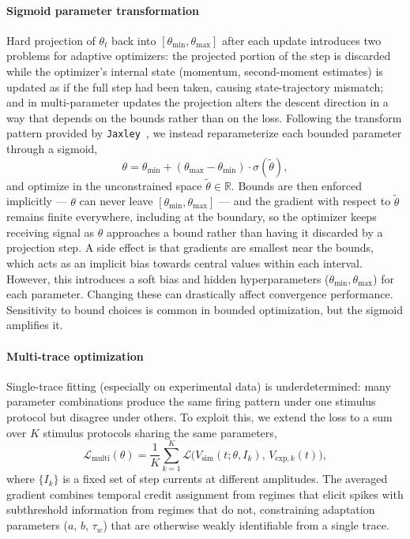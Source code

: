 \paragraph{Sigmoid parameter transformation}\label{sec:method:opt:stabilization:sigmoid}
Hard projection of $\theta_t$ back into $[\theta_{\min}, \theta_{\max}]$ after each update introduces two problems for adaptive optimizers:
the projected portion of the step is discarded while the optimizer's internal state (momentum, second-moment estimates) is updated as if the full step had been taken, causing state-trajectory mismatch;
and in multi-parameter updates the projection alters the descent direction in a way that depends on the bounds rather than on the loss.
Following the transform pattern provided by \texttt{Jaxley}~\cite{Deistler2025},
we instead reparameterize each bounded parameter through a sigmoid,
\begin{equation}
    \theta = \theta_{\min} + (\theta_{\max} - \theta_{\min}) \cdot \sigma(\tilde{\theta}),
\end{equation}
and optimize in the unconstrained space $\tilde{\theta}\in\mathbb{R}$.
Bounds are then enforced implicitly --- $\theta$ can never leave $[\theta_{\min},\theta_{\max}]$ ---
and the gradient with respect to $\tilde{\theta}$ remains finite everywhere, including at the boundary,
so the optimizer keeps receiving signal as $\theta$ approaches a bound rather than having it discarded by a projection step.
A side effect is that gradients are smallest near the bounds, which acts as an implicit bias towards central values within each interval.
However, this introduces a soft bias and hidden hyperparameters ($\theta_{\min}, \theta_{\max}$) for each parameter.
Changing these can drastically affect convergence performance.
Sensitivity to bound choices is common in bounded optimization, but the sigmoid amplifies it.

\paragraph{Multi-trace optimization}\label{sec:method:opt:stabilization:multi-trace}
Single-trace fitting (especially on experimental data) is underdetermined: many parameter combinations produce the same firing pattern under one stimulus protocol but disagree under others.
To exploit this, we extend the loss to a sum over $K$ stimulus protocols sharing the same parameters,
\begin{equation}
    \mathcal{L}_{\mathrm{multi}}(\theta) = \frac{1}{K} \sum_{k=1}^{K} \mathcal{L}\bigl(V_{\mathrm{sim}}(t; \theta, I_k),\, V_{\mathrm{exp},k}(t)\bigr),
\end{equation}
where $\{I_k\}$ is a fixed set of step currents at different amplitudes.
The averaged gradient combines temporal credit assignment from regimes that elicit spikes with subthreshold information from regimes that do not,
constraining adaptation parameters ($a$, $b$, $\tau_w$) that are otherwise weakly identifiable from a single trace.

